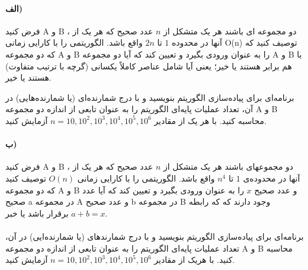 \documentclass[]{article}
\begin{document}
\paragraph[3.1]{الف)}
فرض کنید A و B ، دو مجموعه ای باشند هر یک متشکل از $n$ عدد صحیح که هر یک از آنها در محدوده $1$ تا $2n$ واقع باشد.
الگوریتمی را با کارایی زمانی O(n) توصیف کنید که که دو مجموعه A و B را به عنوان ورودی بگیرد و تعیین کند که آیا دو مجموعه A و B با هم برابر هستند یا خیر؛
یعنی آیا شامل عناصر کاملاً یکسانی (گرچه با ترتیب متفاوت) هستند یا خیر.

برنامه‌ای برای پیاده‌سازی الگوریتم بنویسید و با درج شمارنده‌ای (یا شمارنده‌هایی) در آن، تعداد عملیات پایه‌ای الگوریتم را به عنوان تابعی از اندازه دو مجموعه A و B محاسبه کنید. با هر یک از مقادیر 
$n=10, 10^2, 10^3, 10^4, 10^5, 10^6$
آزمایش کنید. 
\paragraph[3.2]{ب)}
فرض کنید A و B ، دو مجموعهای باشند هر یک متشکل از
$n$ عدد صحیح  که هر یک از آنها در محدوده‌ی
$1$ تا $n^4$ واقع باشد.
الگوریتمی را با کارایی زمانی $O(n)$ توصیف کنید 
که دو مجموعه A و B و عدد صحیح $x$ را به عنوان ورودی بگیرد و تعیین کند که آیا عدد صحیح a در مجموعه A و عدد صحیح b در مجموعه B وجود دارند که
که رابطه $a+b=x$ برقرار باشد یا خبر.
\paragraph[3.3]{}
برنامه‌ای برای پیاده‌سازی الگوریتم بنویسید و با درج شمارندهای (یا شمارنده‌ایی) در آن، تعداد عملیات پایه‌ای الگوریتم را به عنوان تابعی از اندازه دو مجموعه A و B محاسبه کنید.
با هریک از مقادیر $n=10, 10^2, 10^3, 10^4, 10^5, 10^6$ آزمایش کنید.
\end{document}
